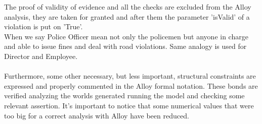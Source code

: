 \documentclass{article}
\begin{document}
The proof of validity of evidence and all the checks are excluded from the Alloy
analysis, they are taken for granted and after them the parameter 'isValid' of a
violation is put on 'True'.\\
When we say Police Officer mean not only the policemen but anyone in charge and
able to issue fines and deal with road violations. Same analogy is used for
Director and Employee.\\
\\
Furthermore, some other necessary, but less important, structural constraints
are expressed and properly commented in the Alloy formal notation. These bonds
are verified analyzing the worlds generated running the model and checking some
relevant assertion. It's important to notice that some numerical values that
were too big for a correct analysis with Alloy have been reduced. 
\newpage


\newpage
\end{document}
